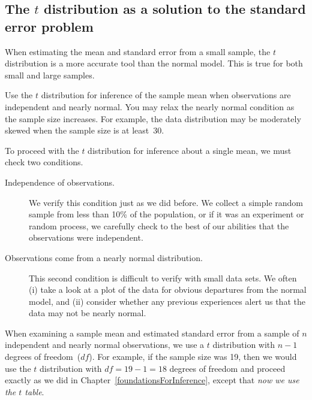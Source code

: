 \subsection{The $t$ distribution as a solution to the standard error problem}
\label{tDistSolutionToSEProblem}

When estimating the mean and standard error from a small sample, the $t$ distribution is a more accurate tool than the normal model. This is true for both small and large samples.

\begin{tipBox}{
Use the $t$ distribution for inference of the sample mean when observations are independent and nearly normal. You may relax the nearly normal condition as the sample size increases. For example, the data distribution may be moderately skewed when the sample size is at least~30.
}
\end{tipBox}


To proceed with the $t$ distribution for inference about a single mean, we must check two conditions.
\begin{description}
\item[Independence of observations.] We verify this condition just as we did before. We collect a simple random sample from less than 10\% of the population, or if it was an experiment or random process, we carefully check to the best of our abilities that the observations were independent.
\item[Observations come from a nearly normal distribution.] This second condition is difficult to verify with small data sets. We often (i) take a look at a plot of the data for obvious departures from the normal model, and (ii) consider whether any previous experiences alert us that the data may not be nearly normal.
\end{description}
When examining a sample mean and estimated standard error from a sample of $n$ independent and nearly normal observations, we use a $t$ distribution with $n-1$ degrees of freedom~($df$). For example, if the sample size was 19, then we would use the $t$ distribution with $df=19-1=18$ degrees of freedom and proceed exactly as we did in Chapter~\ref{foundationsForInference}, except that \emph{now we use the $t$ table}.









